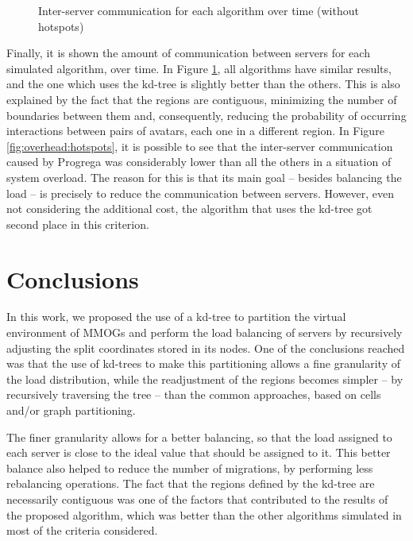 \documentclass[acmjacm]{acmtrans2m}
\begin{document}
\begin{figure}[!t]
	\caption{Inter-server communication for each algorithm over time (without hotspots)}
	\label{fig:overhead:uniform}
\end{figure}


Finally, it is shown the amount of communication between servers for each simulated algorithm, over time. In Figure \ref{fig:overhead:uniform}, all algorithms have similar results, and the one which uses the kd-tree is slightly better than the others. This is also explained by the fact that the regions are contiguous, minimizing the number of boundaries between them and, consequently, reducing the probability of occurring interactions between pairs of avatars, each one in a different region. In Figure \ref{fig:overhead:hotspots}, it is possible to see that the inter-server communication caused by Progrega was considerably lower than all the others in a situation of system overload. The reason for this is that its main goal -- besides balancing the load -- is precisely to reduce the communication between servers. However, even not considering the additional cost, the algorithm that uses the kd-tree got second place in this criterion.

\section{Conclusions}
\label{sec:conc}

In this work, we proposed the use of a kd-tree to partition the virtual environment of MMOGs and perform the load balancing of servers by recursively adjusting the split coordinates stored in its nodes. One of the conclusions reached was that the use of kd-trees to make this partitioning allows a fine granularity of the load distribution, while the readjustment of the regions becomes simpler -- by recursively traversing the tree -- than the common approaches, based on cells and/or graph partitioning.

The finer granularity allows for a better balancing, so that the load assigned to each server is close to the ideal value that should be assigned to it. This better balance also helped to reduce the number of migrations, by performing less rebalancing operations. The fact that the regions defined by the kd-tree are necessarily contiguous was one of the factors that contributed to the results of the proposed algorithm, which was better than the other algorithms simulated in most of the criteria considered.
\end{document}
